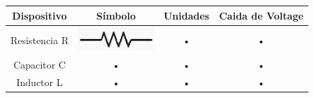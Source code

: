 \documentclass[10pt,a4paper]{article}
\begin{document}
\begin{tabular}{|c|c|c|c|}
\hline 
Dispositivo & S\'imbolo & Unidades & Caida de Voltage \\ 
\hline 
Resistencia R & \includegraphics[scale=1]{resistencia.png}   & • & • \\ 
\hline 
Capacitor C & • & • & • \\ 
\hline 
Inductor L& • & • & • \\ 
\hline 
\end{tabular} 
\end{document}
